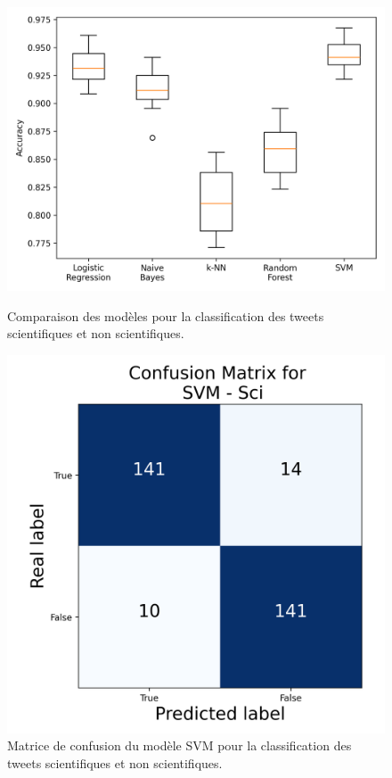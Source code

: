 \begin{figure}[H]
    \centering
    \begin{minipage}[b]{0.55\textwidth}
        \centering
        \includegraphics[width=\textwidth]{images/model_comparison_1}
        \caption{Comparaison des modèles pour la classification des tweets scientifiques et non scientifiques.}
        \label{fig:model_comparison_sci_nsci}
    \end{minipage}\hfill
    \begin{minipage}[b]{0.4\textwidth}
        \centering
        \includegraphics[width=\textwidth]{images/confusion_1.json-SVM_Sci_confusion_matrix}
        \caption{Matrice de confusion du modèle SVM pour la classification des tweets scientifiques et non scientifiques.}
        \label{fig:confusion_1.json-SVM_sci_confusion_matrix}
    \end{minipage}
\end{figure}

